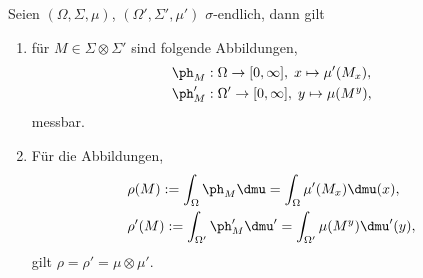 \begin{prop}
\label{prop:3.51}
Seien $(\Omega,\Sigma,\mu)$, $(\Omega',\Sigma',\mu')$ $\sigma$-endlich, dann
gilt
\begin{enumerate}[label=(\roman{*})]
  \item für $M\in\Sigma\otimes\Sigma'$ sind folgende Abbildungen,
\begin{align*}
&\ph_M : \Omega\to[0,\infty],\; x\mapsto \mu'(M_x),\\
&\ph_M' : \Omega'\to[0,\infty],\; y\mapsto \mu(M^y),
\end{align*}
messbar.
\item
Für die Abbildungen,
\begin{align*}
&\rho(M) := \int_\Omega \ph_M \dmu = \int_\Omega \mu'(M_x) \dmu(x),\\
&\rho'(M) := \int_{\Omega'} \ph_M' \dmu' = \int_{\Omega'} \mu(M^y) \dmu'(y),
\end{align*}
gilt $\rho = \rho' = \mu\otimes\mu'$.\fishhere
\end{enumerate}
\end{prop}
